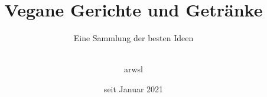 \setcounter{page}{-1}
\subject{\vspace{2cm}
	\large Rezeptsammlung
	\vspace{1cm}
	}
\title{Vegane Gerichte und Getränke}
\subtitle{Eine Sammlung der besten Ideen}

\author{\vspace{4cm}\\
	arwsl\\
	\vspace{2cm}}

\date{seit Januar 2021}




\maketitle
\thispagestyle{empty}
\cleardoubleemptypage
